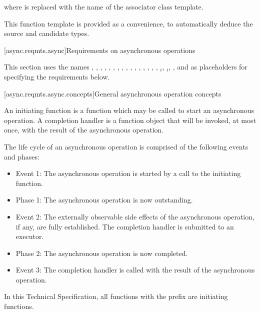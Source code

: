 where  is replaced with the name of the associator class template.
\begin{note} This function template is provided as a convenience, to automatically deduce the source and candidate types. \end{note}



[async.reqmts.async]{Requirements on asynchronous operations}

\pnum
This section uses the names , , , , , , , , , , , , , , , , $_i$, $_i$, , and  as placeholders for specifying the requirements below.


[async.reqmts.async.concepts]{General asynchronous operation concepts}

\pnum
An initiating function is a function which may be called to start an asynchronous operation. A completion handler is a function object that will be invoked, at most once, with the result of the asynchronous operation.

\pnum
 The life cycle of an asynchronous operation is comprised of the following events and phases:

\begin{itemize}
\item
Event 1: The asynchronous operation is started by a call to the initiating function.

\item
Phase 1: The asynchronous operation is now outstanding.

\item
Event 2: The externally observable side effects of the asynchronous operation, if any, are fully established. The completion handler is submitted to an executor.

\item
Phase 2: The asynchronous operation is now completed.

\item
Event 3: The completion handler is called with the result of the asynchronous operation.
\end{itemize}

\pnum
In this Technical Specification, all functions with the prefix  are initiating functions.



